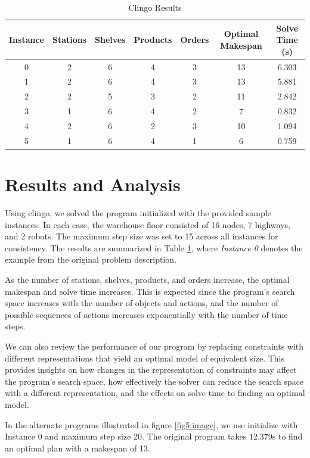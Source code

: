 \documentclass[letterpaper]{article}
\begin{document}
\begin{table}[t]
    \centering
    \caption{Clingo Results}\smallskip
        \begin{tabular}{|c|c|c|c|c|c|c|} \hline
        Instance & Stations & Shelves & Products & Orders & Optimal Makespan & Solve Time (s) \\ \hline
        0 & 2 & 6 & 4 & 3 & 13 & 6.303 \\
        1 & 2 & 6 & 4 & 3 & 13 & 5.881 \\
        2 & 2 & 5 & 3 & 2 & 11 & 2.842 \\
        3 & 1 & 6 & 4 & 2 & 7 & 0.832 \\
        4 & 2 & 6 & 2 & 3 & 10 & 1.094 \\
        5 & 1 & 6 & 4 & 1 & 6 & 0.759 \\ \hline
        \end{tabular}
    \label{table1}
    \end{table}

\section{Results and Analysis}

Using clingo, we solved the program initialized with the provided sample instances. In each case, the warehouse floor consisted of 16 nodes, 7 highways, and 2 robots. The maximum step size was set to 15 across all instances for consistency. The results are summarized in Table \ref{table1}, where \emph{Instance 0} denotes the example from the original problem description.


As the number of stations, shelves, products, and orders increase, the optimal makespan and solve time increases. This is expected since the program's search space increases with the number of objects and actions, and the number of possible sequences of actions increases exponentially with the number of time steps.

We can also review the performance of our program by replacing constraints with different representations that yield an optimal model of equivalent size. This provides insights on how changes in the representation of constraints may affect the program's search space, how effectively the solver can reduce the search space with a different representation, and the effects on solve time to finding an optimal model.

In the alternate programs illustrated in figure \ref{fig5:image}, we use initialize with Instance 0 and maximum step size 20. The original program takes 12.379s to find an optimal plan with a makespan of 13.
\end{document}
